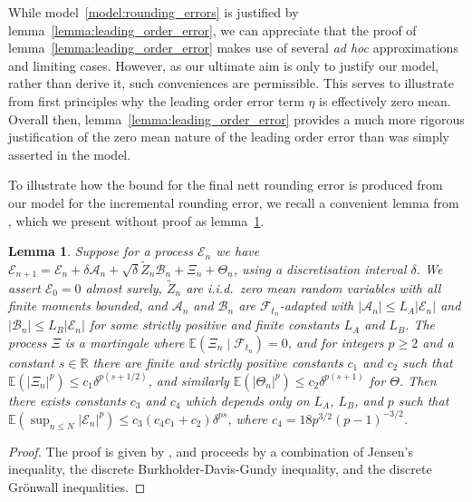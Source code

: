 \documentclass[9pt,a4paper,english]{extarticle}
\newtheorem{lemma}[theorem]{Lemma}
\begin{document}
While model~\ref{model:rounding_errors} is justified by lemma~\ref{lemma:leading_order_error}, we can appreciate that the proof of lemma~\ref{lemma:leading_order_error} makes use of several \textit{ad hoc} approximations and limiting cases. However, as our ultimate aim is only to justify our model, rather than derive it, such conveniences are permissible. This serves to illustrate from first principles why the leading order error term $ \eta $ is effectively zero mean. Overall then, lemma~\ref{lemma:leading_order_error} provides a much more rigorous justification of the zero mean nature of the leading order error than was simply asserted in the  \citet{arciniega2003rounding} model. 

To illustrate how the bound for the final nett rounding error is produced from our model for the incremental rounding error, we recall a convenient lemma from \citeauthor{giles2020approximate} \citep[lemma~4.3]{giles2020approximate} \citep[lemma~5.2.3]{sheridan2020nested}, which we present without proof as lemma~\ref{lemma:strong_error_bound}.

\begin{lemma}
\label{lemma:strong_error_bound}
Suppose for a process $ \mathcal{E}_n $ we have 
$ \mathcal{E}_{n+1} = \mathcal{E}_n + \delta \mathcal{A}_n + \sqrt{\delta} \widetilde{Z}_n \mathcal{B}_n + \Xi_n + \Theta_n $,
using a discretisation interval $ \delta $. 
We assert $ \mathcal{E}_0 = 0 $ almost surely, $ \widetilde{Z}_n $ are i.i.d.\ zero mean random variables with all finite moments bounded, and $ \mathcal{A}_n $ and $ \mathcal{B}_n $ are $ \mathcal{F}_{t_n} $-adapted with $ \lvert \mathcal{A}_n\rvert \leq L_A \lvert \mathcal{E}_n\rvert  $ and $ \lvert \mathcal{B}_n\rvert \leq L_B \lvert \mathcal{E}_n\rvert  $ for some strictly positive and finite constants $ L_A $ and $ L_B $. The process $ \Xi $ is a martingale where $ \mathbb{E}(\Xi_n\mid\mathcal{F}_{t_n}) = 0 $, and for integers $ p \geq 2 $  and a constant $ s \in \mathbb{R} $ there are finite and strictly positive constants $ c_1 $ and $ c_2 $ such that $ \mathbb{E}(\lvert\Xi_n\rvert^p) \leq c_1 \delta^{p(s + 1/2)} $, and similarly $ \mathbb{E}(\lvert\Theta_n\rvert^p) \leq c_2 \delta^{p(s + 1)} $ for $ \Theta $. Then there exists constants $ c_3 $ and $ c_4 $ which depends only on $ L_A $, $ L_B $, and $ p $ such that 
$ \mathbb{E}(\sup_{n \leq N} \lvert\mathcal{E}_n\rvert^p) \leq c_3(c_4 c_1 + c_2)\delta^{ps} $, 
where $ c_4 = 18p^{3/2}(p - 1)^{-3/2} $.
\end{lemma}

\begin{proof}
The proof is given by \citeauthor{giles2020approximate} \citep[lemma~4.3]{giles2020approximate} \citep[lemma~5.2.3]{sheridan2020nested}, and proceeds by a combination of Jensen's inequality, the discrete Burkholder-Davis-Gundy inequality, and the discrete Gr\"{o}nwall inequalities. \qedhere
\end{proof}
\end{document}
